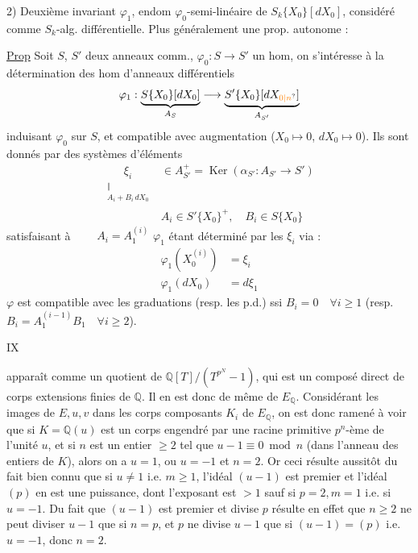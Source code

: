 2) Deuxième invariant $\varphi_1$, endom $\varphi_0$-semi-linéaire de $S_k\{X_0\}[dX_0]$, considéré comme $S_k$-alg. différentielle. 
Plus généralement une prop. autonome :

\uline{Prop} Soit $S$, $S'$ deux anneaux comm., $\varphi_0:S\longrightarrow S'$ un hom, on s'intéresse à la détermination des hom d'anneaux différentiels
\[
\varphi_1:\underbrace{S\{X_0\}[dX_0]}_{A_S}\longrightarrow\underbrace{S'\{X_0\}[dX_{\unsure{0|n}}]}_{A_{S'}}
\]
induisant $\varphi_0$ sur $S$, et compatible avec augmentation ($X_0\longmapsto0$, $dX_0\longmapsto0$). Ils sont donnés  par des systèmes d'éléments
\[
\begin{aligned}
\underset{\substack{\Vert\\A_i+B_i\,dX_0}}{\xi_i}&\in A_{S'}^+=\operatorname{Ker}(\alpha_{S'}:A_{S'}\longrightarrow S')\\
&A_i\in S'\{X_0\}^+,\quad B_i\in S\{X_0\}
\end{aligned}
\]
satisfaisant à $\qquad A_i=A_1^{(i)}$
$\varphi_1$ étant déterminé par les $\xi_i$ via :
\[
\begin{aligned}
\varphi_1(X_0^{(i)})&=\xi_i\\
\varphi_1(dX_0)&=d\xi_1
\end{aligned}
\]
$\varphi$ est compatible avec les graduations (resp. les p.d.) ssi $B_i=0\quad\forall i\geq1$ (resp. $B_i=A_1^{(i-1)}B_1\quad\forall i\geq2$).

\hfill IX

\margin{$\begin{gathered}\cdot\\\cdot\end{gathered}$}apparaît comme un quotient de $\mathbb Q[T]/(T^{p^N}-1)$, qui est un composé direct
de corps extensions finies de $\mathbb Q$. Il en est donc de même de $E_{\mathbb Q}$. Considérant
les images de $E,u,v$ dans les corps composants $K_i$ de $E_{\mathbb Q}$, on est donc
ramené à voir que si $K=\mathbb Q(u)$ est un corps engendré par une racine
primitive $p^n$-ème de l'unité $u$, et si $n$ est un entier $\geq2$ tel que $u-1\equiv0\bmod n$ (dans l'anneau des entiers de $K$), alors on a $u=1$, ou $u=-1$ et $n=2$.
Or ceci résulte aussitôt du fait bien connu que si $u\ne1$ i.e. $m\geq1$, l'idéal $(u-1)$ est premier et l'idéal $(p)$ en est une puissance, dont l'exposant est $>1$ sauf si $p=2,m=1$ i.e. si $u=-1$.
Du fait que $(u-1)$ est premier et divise $p$ résulte en effet que $n\geq2$ ne peut diviser $u-1$ que si $n=p$, et $p$ ne divise $u-1$ que si $(u-1)=(p)$ i.e. $u=-1$, donc $n=2$.

